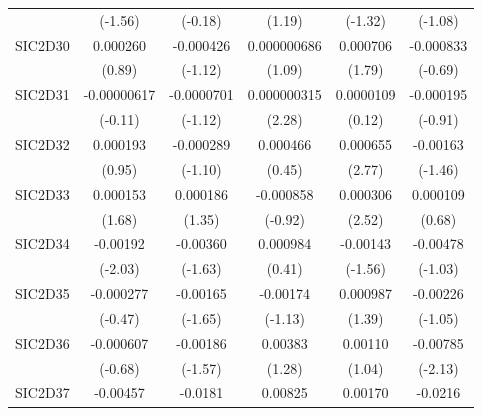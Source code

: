 \begin{table}[htbp]
\begin{tabular}{l*{5}{c}}
            &     (-1.56)         &     (-0.18)         &      (1.19)         &     (-1.32)         &     (-1.08)         \\
SIC2D30     &    0.000260         &   -0.000426         & 0.000000686         &    0.000706         &   -0.000833         \\
            &      (0.89)         &     (-1.12)         &      (1.09)         &      (1.79)         &     (-0.69)         \\
SIC2D31     & -0.00000617         &  -0.0000701         & 0.000000315\sym{*}  &   0.0000109         &   -0.000195         \\
            &     (-0.11)         &     (-1.12)         &      (2.28)         &      (0.12)         &     (-0.91)         \\
SIC2D32     &    0.000193         &   -0.000289         &    0.000466         &    0.000655\sym{**} &    -0.00163         \\
            &      (0.95)         &     (-1.10)         &      (0.45)         &      (2.77)         &     (-1.46)         \\
SIC2D33     &    0.000153         &    0.000186         &   -0.000858         &    0.000306\sym{*}  &    0.000109         \\
            &      (1.68)         &      (1.35)         &     (-0.92)         &      (2.52)         &      (0.68)         \\
SIC2D34     &    -0.00192\sym{*}  &    -0.00360         &    0.000984         &    -0.00143         &    -0.00478         \\
            &     (-2.03)         &     (-1.63)         &      (0.41)         &     (-1.56)         &     (-1.03)         \\
SIC2D35     &   -0.000277         &    -0.00165         &    -0.00174         &    0.000987         &    -0.00226         \\
            &     (-0.47)         &     (-1.65)         &     (-1.13)         &      (1.39)         &     (-1.05)         \\
SIC2D36     &   -0.000607         &    -0.00186         &     0.00383         &     0.00110         &    -0.00785\sym{*}  \\
            &     (-0.68)         &     (-1.57)         &      (1.28)         &      (1.04)         &     (-2.13)         \\
SIC2D37     &    -0.00457         &     -0.0181\sym{***}&     0.00825         &     0.00170         &     -0.0216         \\

\end{tabular}
\end{table}
